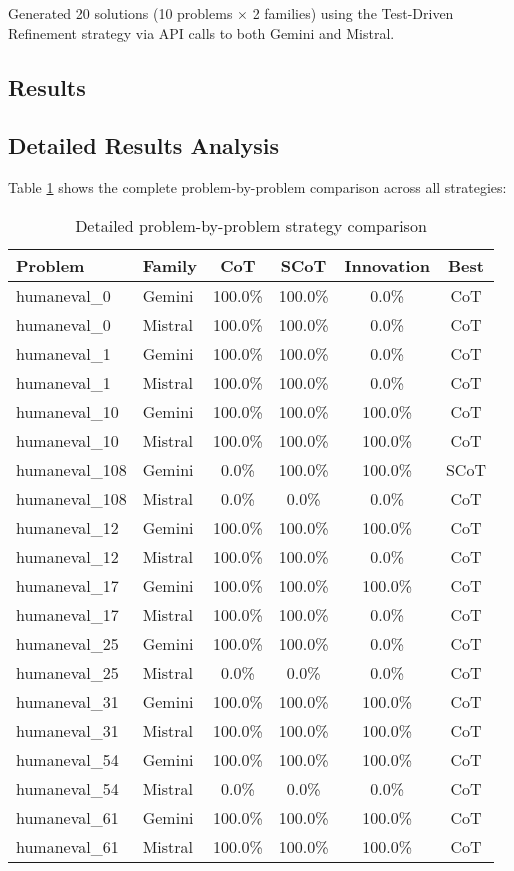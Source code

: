 \documentclass[11pt]{article}
\begin{document}
Generated 20 solutions (10 problems $\times$ 2 families) using the Test-Driven Refinement strategy via API calls to both Gemini and Mistral.

\subsection{Results}

\subsection{Detailed Results Analysis}

Table \ref{tab:detailed_comparison} shows the complete problem-by-problem comparison across all strategies:

\begin{table}[h]
\centering
\begin{tabular}{|l|l|c|c|c|c|}
\hline
\textbf{Problem} & \textbf{Family} & \textbf{CoT} & \textbf{SCoT} & \textbf{Innovation} & \textbf{Best} \\
\hline
humaneval\_0 & Gemini & 100.0\% & 100.0\% & 0.0\% & CoT \\
humaneval\_0 & Mistral & 100.0\% & 100.0\% & 0.0\% & CoT \\
humaneval\_1 & Gemini & 100.0\% & 100.0\% & 0.0\% & CoT \\
humaneval\_1 & Mistral & 100.0\% & 100.0\% & 0.0\% & CoT \\
humaneval\_10 & Gemini & 100.0\% & 100.0\% & 100.0\% & CoT \\
humaneval\_10 & Mistral & 100.0\% & 100.0\% & 100.0\% & CoT \\
humaneval\_108 & Gemini & 0.0\% & 100.0\% & 100.0\% & SCoT \\
humaneval\_108 & Mistral & 0.0\% & 0.0\% & 0.0\% & CoT \\
humaneval\_12 & Gemini & 100.0\% & 100.0\% & 100.0\% & CoT \\
humaneval\_12 & Mistral & 100.0\% & 100.0\% & 0.0\% & CoT \\
humaneval\_17 & Gemini & 100.0\% & 100.0\% & 100.0\% & CoT \\
humaneval\_17 & Mistral & 100.0\% & 100.0\% & 0.0\% & CoT \\
humaneval\_25 & Gemini & 100.0\% & 100.0\% & 0.0\% & CoT \\
humaneval\_25 & Mistral & 0.0\% & 0.0\% & 0.0\% & CoT \\
humaneval\_31 & Gemini & 100.0\% & 100.0\% & 100.0\% & CoT \\
humaneval\_31 & Mistral & 100.0\% & 100.0\% & 100.0\% & CoT \\
humaneval\_54 & Gemini & 100.0\% & 100.0\% & 100.0\% & CoT \\
humaneval\_54 & Mistral & 0.0\% & 0.0\% & 0.0\% & CoT \\
humaneval\_61 & Gemini & 100.0\% & 100.0\% & 100.0\% & CoT \\
humaneval\_61 & Mistral & 100.0\% & 100.0\% & 100.0\% & CoT \\
\hline
\end{tabular}
\caption{Detailed problem-by-problem strategy comparison}
\label{tab:detailed_comparison}
\end{table}
\end{document}
